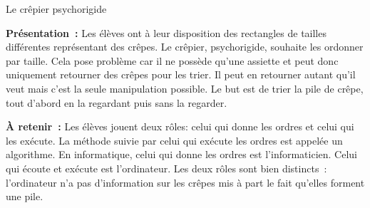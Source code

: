 \documentclass[a4paper,11pt]{article}
\begin{document}
 
 
\begin{center}
\huge
Le crêpier psychorigide 
\end{center}

\textbf{Présentation~:}
Les élèves ont à leur disposition des rectangles de tailles différentes représentant des crêpes. Le crêpier, psychorigide, souhaite les ordonner par taille. Cela pose problème car il ne possède qu'une assiette et peut donc uniquement retourner des crêpes pour les trier. Il peut en retourner autant qu'il veut mais c'est la seule manipulation possible. Le but est de trier la pile de crêpe, tout d'abord en la regardant puis sans la regarder.

\textbf{\`A retenir~:}
Les élèves jouent deux rôles: celui qui donne les ordres et celui qui les exécute. La méthode suivie par celui qui exécute les ordres est appelée un algorithme. En informatique, celui qui donne les ordres est l'informaticien. Celui qui écoute et exécute est l'ordinateur. Les deux rôles sont bien distincts~: l'ordinateur n'a pas d'information sur les crêpes mis à part le fait qu'elles forment une pile.
\end{document}

